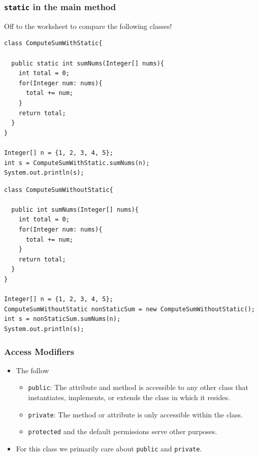 \documentclass{beamer}
\begin{document}
\begin{frame}[fragile]
    \frametitle{\lstinline|static| in the main method}
Off to the worksheet to compare the following classes!\\
\vfill
    \begin{minipage}{0.52\textwidth}
        \begin{lstlisting}[basicstyle=\tiny, frame=trBL]
class ComputeSumWithStatic{

  public static int sumNums(Integer[] nums){
    int total = 0;
    for(Integer num: nums){
      total += num;
    }
    return total;
  }
}

Integer[] n = {1, 2, 3, 4, 5};
int s = ComputeSumWithStatic.sumNums(n);
System.out.println(s);
        \end{lstlisting}
    \end{minipage}
    \hfill
    \begin{minipage}{0.45\textwidth}
        \begin{lstlisting}[basicstyle=\tiny, frame=trBL]
class ComputeSumWithoutStatic{

  public int sumNums(Integer[] nums){
    int total = 0;
    for(Integer num: nums){
      total += num;
    }
    return total;
  }
}

Integer[] n = {1, 2, 3, 4, 5};
ComputeSumWithoutStatic nonStaticSum = new ComputeSumWithoutStatic();
int s = nonStaticSum.sumNums(n);
System.out.println(s);
        \end{lstlisting}
    \end{minipage}
    \vfill
\end{frame}

\begin{frame}
    \frametitle{Access Modifiers}
    \begin{itemize}
        \item The follow
        \begin{itemize}
            \item \lstinline|public|: The attribute and method is accessible to any other class that instantiates, implements, or extends the class in which it resides.
            \item \lstinline|private|: The method or attribute is only accessible within the class.
            \item \lstinline|protected| and the default permissions serve other purposes.
        \end{itemize}
        \item For this class we primarily care about \lstinline|public| and \lstinline|private|.
    \end{itemize}
    
\end{frame}
\end{document}
